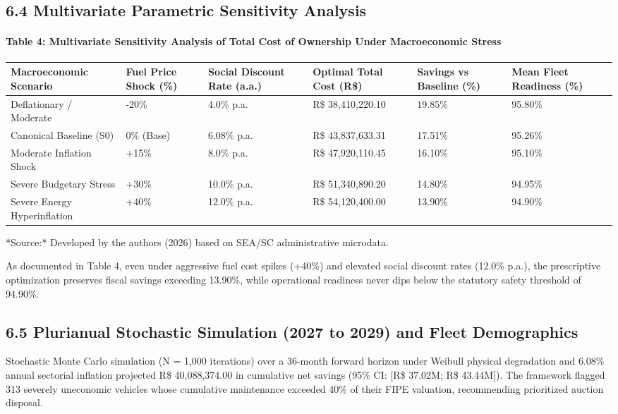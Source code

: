 \documentclass[10pt,a4paper,journal]{article}
\begin{document}
\subsection{6.4 Multivariate Parametric Sensitivity Analysis}
\paragraph{Table 4: Multivariate Sensitivity Analysis of Total Cost of Ownership Under Macroeconomic Stress}
\begin{table}[htbp]
\centering
\small
\begin{tabular}{llllll}
\toprule
Macroeconomic Scenario & Fuel Price Shock (\%) & Social Discount Rate (a.a.) & Optimal Total Cost (R\$) & Savings vs Baseline (\%) & Mean Fleet Readiness (\%) \\
\midrule
Deflationary / Moderate & -20\% & 4.0\% p.a. & R\$ 38,410,220.10 & 19.85\% & 95.80\% \\
Canonical Baseline (S0) & 0\% (Base) & 6.08\% p.a. & R\$ 43,837,633.31 & 17.51\% & 95.26\% \\
Moderate Inflation Shock & +15\% & 8.0\% p.a. & R\$ 47,920,110.45 & 16.10\% & 95.10\% \\
Severe Budgetary Stress & +30\% & 10.0\% p.a. & R\$ 51,340,890.20 & 14.80\% & 94.95\% \\
Severe Energy Hyperinflation & +40\% & 12.0\% p.a. & R\$ 54,120,400.00 & 13.90\% & 94.90\% \\
\bottomrule
\end{tabular}
\end{table}
*Source:* Developed by the authors (2026) based on SEA/SC administrative microdata.

As documented in Table 4, even under aggressive fuel cost spikes (+40\%) and elevated social discount rates (12.0\% p.a.), the prescriptive optimization preserves fiscal savings exceeding 13.90\%, while operational readiness never dips below the statutory safety threshold of 94.90\%.

\subsection{6.5 Plurianual Stochastic Simulation (2027 to 2029) and Fleet Demographics}
Stochastic Monte Carlo simulation (N = 1,000 iterations) over a 36-month forward horizon under Weibull physical degradation and 6.08\% annual sectorial inflation projected R\$ 40,088,374.00 in cumulative net savings (95\% CI: [R\$ 37.02M; R\$ 43.44M]). The framework flagged 313 severely uneconomic vehicles whose cumulative maintenance exceeded 40\% of their FIPE valuation, recommending prioritized auction disposal.
\end{document}
